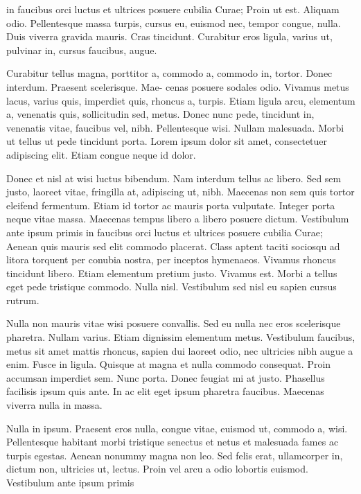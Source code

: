 \documentclass[APA,LATO1COL]{WileyNJD-v2}
\begin{document}
in faucibus orci luctus et ultrices posuere cubilia Curae; Proin ut est. Aliquam odio. Pellentesque massa turpis, cursus
eu, euismod nec, tempor congue, nulla. Duis viverra gravida mauris. Cras tincidunt. Curabitur eros ligula, varius ut,
pulvinar in, cursus faucibus, augue.

Curabitur tellus magna, porttitor a, commodo a, commodo in, tortor. Donec interdum. Praesent scelerisque. Mae-
cenas posuere sodales odio. Vivamus metus lacus, varius quis, imperdiet quis, rhoncus a, turpis. Etiam ligula arcu,
elementum a, venenatis quis, sollicitudin sed, metus. Donec nunc pede, tincidunt in, venenatis vitae, faucibus vel,
nibh. Pellentesque wisi. Nullam malesuada. Morbi ut tellus ut pede tincidunt porta. Lorem ipsum dolor sit amet,
consectetuer adipiscing elit. Etiam congue neque id dolor.

Donec et nisl at wisi luctus bibendum. Nam interdum tellus ac libero. Sed sem justo, laoreet vitae, fringilla at,
adipiscing ut, nibh. Maecenas non sem quis tortor eleifend fermentum. Etiam id tortor ac mauris porta vulputate.
Integer porta neque vitae massa. Maecenas tempus libero a libero posuere dictum. Vestibulum ante ipsum primis in
faucibus orci luctus et ultrices posuere cubilia Curae; Aenean quis mauris sed elit commodo placerat. Class aptent
taciti sociosqu ad litora torquent per conubia nostra, per inceptos hymenaeos. Vivamus rhoncus tincidunt libero.
Etiam elementum pretium justo. Vivamus est. Morbi a tellus eget pede tristique commodo. Nulla nisl. Vestibulum
sed nisl eu sapien cursus rutrum.

Nulla non mauris vitae wisi posuere convallis. Sed eu nulla nec eros scelerisque pharetra. Nullam varius. Etiam
dignissim elementum metus. Vestibulum faucibus, metus sit amet mattis rhoncus, sapien dui laoreet odio, nec ultricies
nibh augue a enim. Fusce in ligula. Quisque at magna et nulla commodo consequat. Proin accumsan imperdiet sem.
Nunc porta. Donec feugiat mi at justo. Phasellus facilisis ipsum quis ante. In ac elit eget ipsum pharetra faucibus.
Maecenas viverra nulla in massa.

Nulla in ipsum. Praesent eros nulla, congue vitae, euismod ut, commodo a, wisi. Pellentesque habitant morbi
tristique senectus et netus et malesuada fames ac turpis egestas. Aenean nonummy magna non leo. Sed felis erat,
ullamcorper in, dictum non, ultricies ut, lectus. Proin vel arcu a odio lobortis euismod. Vestibulum ante ipsum primis
\end{document}
